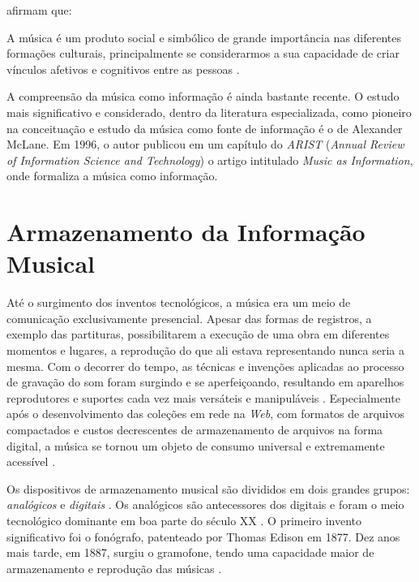  afirmam que:

\begin{citacao}
A música é um produto social e simbólico de grande importância nas diferentes formações culturais, principalmente se considerarmos a sua capacidade de criar vínculos afetivos e cognitivos entre as pessoas \cite{lima&santini2006}.
\end{citacao}

A compreensão da música como informação é ainda bastante recente. O estudo mais significativo e considerado, dentro da literatura especializada, como pioneiro na conceituação e estudo da música como fonte de informação é o de Alexander McLane. Em 1996, o autor publicou em um capítulo do \textit{ARIST} (\textit{Annual Review of Information Science and Technology}) o artigo intitulado \textit{Music as Information}, onde formaliza a música como informação.

\section{Armazenamento da Informação Musical} \label{sec:armazenamento}

Até o surgimento dos inventos tecnológicos, a música era um meio de comunicação exclusivamente presencial. Apesar das formas de registros, a exemplo das partituras, possibilitarem a execução de uma obra em diferentes momentos e lugares, a reprodução do que ali estava representando nunca seria a mesma. Com o decorrer do tempo,  as técnicas e invenções aplicadas ao processo de gravação do som foram surgindo e se aperfeiçoando, resultando em aparelhos reprodutores e suportes cada vez mais versáteis e manipuláveis \cite{daquino2012}. Especialmente após o desenvolvimento das coleções em rede na \textit{Web}, com formatos de arquivos compactados e custos decrescentes de armazenamento de arquivos na forma digital, a música se tornou um objeto de consumo universal e extremamente acessível \cite{gomes2015}.

Os dispositivos de armazenamento musical são divididos em dois grandes grupos: \textit{analógicos} e \textit{digitais} \cite{andrade&crispim2008}. Os analógicos são antecessores dos digitais e foram o meio tecnológico dominante em boa parte do século XX \cite{paulozuben2004}. O primeiro invento significativo foi o fonógrafo, patenteado por Thomas Edison em 1877. Dez anos mais tarde, em 1887, surgiu o gramofone, tendo uma capacidade maior de armazenamento e reprodução das músicas \cite{marchi2005}. 

